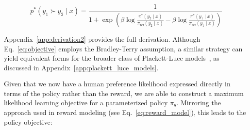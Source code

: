 \begin{equation}\label{eq:objective}
    p^*(y_1\succ y_2 \mid x)=\frac{1}{1 + \exp\left(\beta \log \frac{\pi^*(y_2\mid x)}{\pi_\text{ref}(y_2\mid x)} - \beta \log \frac{\pi^*(y_1\mid x)}{\pi_\text{ref}(y_1\mid x)}\right)}
\end{equation}

Appendix~\ref{app:derivation2} provides the full derivation. Although Eq.~\ref{eq:objective} employs the Bradley-Terry assumption, a similar strategy can yield equivalent forms for the broader class of Plackett-Luce models~\citep{plackett1975analysis, luce2012individual}, as discussed in Appendix~\ref{app:plackett_luce_models}.

Given that we now have a human preference likelihood expressed directly in terms of the policy rather than the reward, we are able to construct a maximum likelihood learning objective for a parameterized policy $\pi_\theta$. Mirroring the approach used in reward modeling (see Eq.~\ref{eq:reward_model}), this leads to the policy objective:


